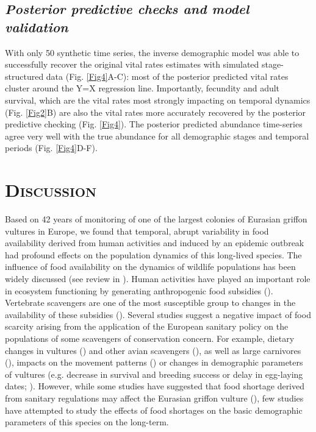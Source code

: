 \documentclass[12pt]{article}
\begin{document}
\subsection*{\textit{Posterior predictive checks and model validation}}
With only 50 synthetic time series, the inverse demographic model was able to successfully recover the original vital rates estimates with simulated stage-structured data (Fig. \ref{Fig4}A-C): most of the posterior predicted vital rates cluster around the Y=X regression line. Importantly, fecundity and adult survival, which are the vital rates most strongly impacting on temporal dynamics (Fig. \ref{Fig2}B) are also the vital rates more accurately recovered by the posterior predictive checking (Fig. \ref{Fig4}). The posterior predicted abundance time-series agree very well with the true abundance for all demographic stages and temporal periods (Fig. \ref{Fig4}D-F). \\


\section*{\textsc{Discussion}}

Based on 42 years of monitoring of one of the largest colonies of Eurasian griffon vultures in Europe, we found that temporal, abrupt variability in food availability derived from human activities and induced by an epidemic outbreak had profound effects on the population dynamics of this long-lived species. The influence of food availability on the dynamics of wildlife populations has been widely discussed (see review in \cite{Ostfeld2000}). Human activities have played an important role in ecosystem functioning by generating anthropogenic food subsidies (\cite{Oro2013}).  Vertebrate scavengers are one of the most susceptible group to changes in the availability of these subsidies (\cite{Cortes-Avizanda2016}). Several studies suggest a negative impact of food scarcity arising from the application of the European sanitary policy on the populations of some scavengers of conservation concern. For example, dietary changes in vultures (\cite{Donazar2010}) and other avian scavengers (\cite{Blanco2014}), as well as large carnivores (\cite{Lagos2015,Llaneza2015,Northrup2012}), impacts on the movement patterns (\cite{Arrondo2018}) or changes in demographic parameters of vultures (e.g. decrease in survival and breeding success or delay in egg-laying dates; \cite{Donazar2009b,Martinez-Abrain2012,Margalida2014a,Donazar2020a}).  However, while some studies have suggested that food shortage derived from sanitary regulations may affect the Eurasian griffon vulture (\cite{Margalida2012}), few studies have attempted to study the effects of food shortages on the basic demographic parameters of this species on the long-term.\\
\end{document}
